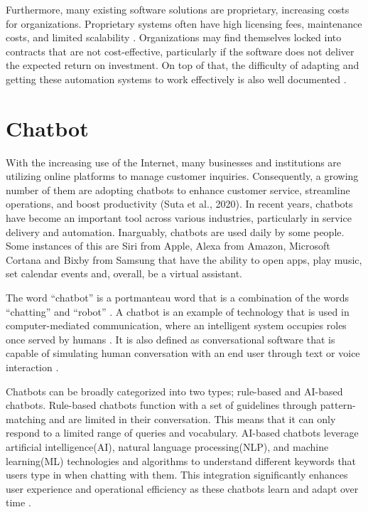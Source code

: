 Furthermore, many existing software solutions are proprietary, increasing costs for organizations. Proprietary systems often have high licensing fees, maintenance costs, and limited scalability \cite{goel2012, prasad2013}. Organizations may find themselves locked into contracts that are not cost-effective, particularly if the software does not deliver the expected return on investment. On top of that, the difficulty of adapting and getting these automation systems to work effectively is also well documented \cite{adams2011}.


\section{Chatbot}
With the increasing use of the Internet, many businesses and institutions are utilizing online platforms to manage customer inquiries. Consequently, a growing number of them are adopting chatbots to enhance customer service, streamline operations, and boost productivity (Suta et al., 2020). In recent years, chatbots have become an important tool across various industries, particularly in service delivery and automation. Inarguably, chatbots are used daily by some people. Some instances of this are Siri from Apple, Alexa from Amazon, Microsoft Cortana and Bixby from Samsung that have the ability to open apps, play music, set calendar events and, overall, be a virtual assistant.

The word “chatbot” is a portmanteau word that is a combination of the words “chatting” and “robot” \cite{rese2020}. A chatbot is an example of technology that is used in computer-mediated communication, where an intelligent system occupies roles once served by humans \cite{beattie2020}. It is also defined as conversational software that is capable of simulating human conversation with an end user through text or voice interaction \cite{Naruzzaman}.

Chatbots can be broadly categorized into two types; rule-based and AI-based chatbots. Rule-based chatbots function with a set of guidelines through pattern-matching and are limited in their conversation. This means that it can only respond to a limited range of queries and vocabulary. AI-based chatbots leverage artificial intelligence(AI), natural language processing(NLP), and machine learning(ML) technologies and algorithms to understand different keywords that users type in when chatting with them. This integration significantly enhances user experience and operational efficiency as these chatbots learn and adapt over time \cite{Kar2016}.

